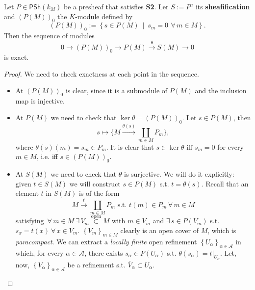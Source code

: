 \begin{prop}\label{prop:PSh_ses}
	Let $P \in \mathsf{PSh}\left( k_M \right)$ be a presheaf that satisfies \textbf{S2}.
	Ler $S := P^a$ its \textbf{sheafification} and $\left( P(M) \right)_0$ the $K$-module defined by
	\begin{equation}
		\left( P(M) \right)_0 := \left\{ s \in P(M) \ \middle|\ s_m = 0\ \,\forall\, m \in M \right\}
	.\end{equation} 
	Then the sequence of modules
	\begin{equation}
		0 \to \left( P(M) \right)_0 \to P(M) \xrightarrow{\theta} S(M) \to 0 
	\end{equation} 
	is exact.
\end{prop} 
\begin{proof}
	We need to check exactness at each point in the sequence.
	\begin{itemize}
		\item At $\left( P(M) \right)_0$ is clear, since it is a submodule of $P(M)$ and the inclusion map is injective.
		\item At $P(M)$ we need to check that $\ker \theta = \left( P(M) \right)_0$.
			Let $s \in P(M)$, then
			\begin{equation}
				s \mapsto \bigg\{ M \xrightarrow{\theta(s)} \coprod_{m \in M} P_m \bigg\}
			,\end{equation} 
			where $\theta(s)(m) = s_m \in P_m$.
			It is clear that $s \in \ker \theta$ iff $s_m = 0$ for every $m \in M$, i.e. iff $s \in \left( P(M) \right)_0$.
		\item At $S(M)$ we need to check that $\theta$ is surjective.
			We will do it explicitly: given $t \in S(M)$ we will construct $s \in P(M)$ s.t. $t = \theta(s)$.
			Recall that an element $t$ in $S(M)$ is of the form
			\begin{equation}
				M \xrightarrow{t} \coprod_{m \in M} P_m \text{ s.t. } t(m) \in P_m \,\forall\, m \in M
			\end{equation} 
			satisfying $ \,\forall\, m \in M\ \exists\, V_m \stackrel{\text{open}}{\subset} M$ with $m \in V_m$ and $ \exists\, s \in P(V_m)$ s.t.  $s_x = t(x) \ \forall\, x \in V_m$.
			$\left\{ V_m \right\}_{m \in M}$ clearly is an open cover of $M$, which is \textit{paracompact}.
			We can extract a \textit{locally finite} open refinement $\left\{ U_\alpha \right\}_{\alpha \in \mathcal{A}}$ in which, for every $\alpha \in \mathcal{A}$, there exists $s_\alpha \in P(U_\alpha)$ s.t. $\theta(s_\alpha) = \left.t\right|_{U_\alpha}$.
				Let, now, $\left\{ V_\alpha \right\}_{\alpha \in \mathcal{A}}$ be a refinement s.t. $\overline{V}_\alpha \subset U_\alpha$.

\end{itemize}
\end{proof}
